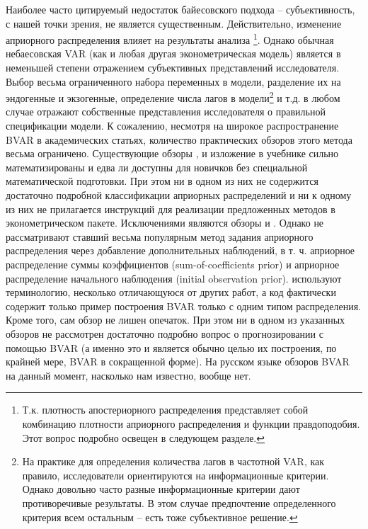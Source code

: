 \documentclass[11pt]{article} %
\begin{document}
Наиболее часто цитируемый недостаток байесовского подхода -- субъективность, с нашей точки зрения, не является существенным. Действительно, изменение априорного распределения влияет на  результаты анализа \footnote{Т.к. плотность апостериорного распределения представляет собой комбинацию плотности априорного распределения и функции правдоподобия. Этот вопрос подробно освещен в следующем разделе.}. Однако обычная небаесовская VAR (как и любая другая эконометрическая модель) является в неменьшей степени отражением субъективных представлений исследователя. Выбор весьма ограниченного набора переменных в модели, разделение их на эндогенные и экзогенные, определение числа лагов в модели\footnote{На практике для определения количества лагов в частотной VAR, как правило, исследователи ориентируются на информационные критерии. Однако довольно часто разные информационные критерии дают противоречивые результаты. В этом случае предпочтение определенного критерия всем остальным -- есть тоже субъективное решение.} и т.д. в любом случае отражают собственные представления исследователя о правильной спецификации модели.    
К сожалению, несмотря на широкое распространение BVAR в академических статьях, количество практических обзоров этого метода  весьма ограничено. Существующие обзоры \cite{karlsson_2012}, \cite{delnegro_schorfheide_2011} и изложение в учебнике \cite{canova_2007} сильно математизированы и едва ли доступны для новичков без специальной математической подготовки.
 При этом ни в одном из них не содержится достаточно подробной классификации априорных распределений и ни к одному из них не прилагается инструкций для реализации предложенных методов в эконометрическом пакете. 
Исключениями являются обзоры \cite{koop_korobilis_2010} и \cite{blake_mumtaz_2012}.
Однако \cite{koop_korobilis_2010} не рассматривают ставший весьма популярным метод задания априорного распределения через добавление дополнительных наблюдений, в т. ч. априорное распределение суммы коэффициентов (sum-of-coefficients prior) и априорное распределение начального наблюдения (initial observation prior).  
\cite{blake_mumtaz_2012} используют терминологию, несколько отличающуюся от других работ, а код фактически содержит только пример построения BVAR только с одним типом распределения. Кроме того, сам обзор не лишен опечаток. При этом ни в одном из указанных обзоров не рассмотрен достаточно подробно вопрос о прогнозировании с помощью BVAR (а именно это и является обычно целью их построения, по крайней мере, BVAR в сокращенной форме). На русском языке обзоров BVAR на данный момент, насколько нам  известно, вообще нет. 
\end{document}
